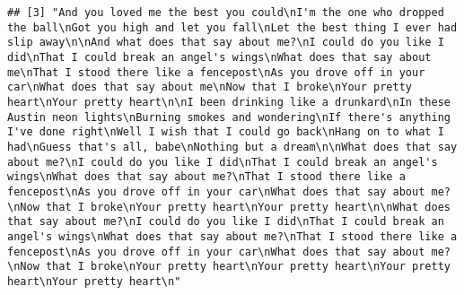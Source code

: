 \documentclass[]{article}
\begin{document}
\begin{verbatim}
## [3] "And you loved me the best you could\nI'm the one who dropped the ball\nGot you high and let you fall\nLet the best thing I ever had slip away\n\nAnd what does that say about me?\nI could do you like I did\nThat I could break an angel's wings\nWhat does that say about me\nThat I stood there like a fencepost\nAs you drove off in your car\nWhat does that say about me\nNow that I broke\nYour pretty heart\nYour pretty heart\n\nI been drinking like a drunkard\nIn these Austin neon lights\nBurning smokes and wondering\nIf there's anything I've done right\nWell I wish that I could go back\nHang on to what I had\nGuess that's all, babe\nNothing but a dream\n\nWhat does that say about me?\nI could do you like I did\nThat I could break an angel's wings\nWhat does that say about me?\nThat I stood there like a fencepost\nAs you drove off in your car\nWhat does that say about me?\nNow that I broke\nYour pretty heart\nYour pretty heart\n\nWhat does that say about me?\nI could do you like I did\nThat I could break an angel's wings\nWhat does that say about me?\nThat I stood there like a fencepost\nAs you drove off in your car\nWhat does that say about me?\nNow that I broke\nYour pretty heart\nYour pretty heart\nYour pretty heart\nYour pretty heart\n"                                                                                                                                                                                                                                                                                                                                                                                                                                                                                                                

\end{verbatim}
\end{document}
